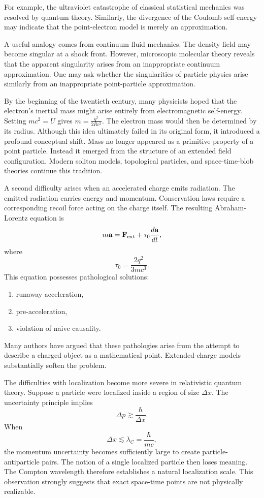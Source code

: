 For example, the ultraviolet catastrophe of classical statistical mechanics
was resolved by quantum theory. Similarly, the divergence of the Coulomb 
self-energy may indicate that the point-electron model is merely an 
approximation.

A useful analogy comes from continuum fluid mechanics. The density field
may become singular at a shock front.
However, microscopic molecular theory reveals that the apparent singularity
arises from an inappropriate continuum approximation.
One may ask whether the singularities of particle physics arise similarly 
from an inappropriate point-particle approximation.

By the beginning of the twentieth century, many physicists hoped that the 
electron's inertial mass might arise entirely from electromagnetic self-energy.
Setting $mc^2=U $ gives $m=\frac{q^2}{2 Rc^2}$.
The electron mass would then be determined by its radius.
Although this idea ultimately failed in its original form, it introduced 
a profound conceptual shift.
Mass no longer appeared as a primitive property of a point particle. 
Instead it emerged from the structure of an extended field configuration.
Modern soliton models, topological particles, and space-time-blob theories 
continue this tradition.

A second difficulty arises when an accelerated charge emits radiation.
The emitted radiation carries energy and momentum. Conservation laws 
require a corresponding recoil force acting on the charge itself.
The resulting Abraham-Lorentz equation is
\begin{equation}
    \label{al-eq}
m\mathbf{a}=\mathbf{F}_{\rm ext}
+\tau_0\frac{d\mathbf{a}}{dt},
\end{equation}
where \[\tau_0=\frac{2 q^2}{3 mc^3}.\]
This equation possesses pathological solutions:
\begin{enumerate}
\item runaway acceleration,
\item pre-acceleration,
\item violation of naive causality.
\end{enumerate}

Many authors have argued that these pathologies arise from the attempt 
to describe a charged object as a mathematical point.
Extended-charge models substantially soften the problem.

The difficulties with localization become more severe in relativistic quantum theory.
Suppose a particle were localized inside a region of size
$\Delta x$. The uncertainty principle implies 
    \[\Delta p \gtrsim \frac{\hbar}{\Delta x}.\]
When
\[\Delta x \lesssim \lambda_C = \frac{\hbar}{mc},\]
the momentum uncertainty becomes sufficiently large to create 
particle-antiparticle pairs.
The notion of a single localized particle then loses meaning.
The Compton wavelength therefore establishes a natural localization scale.
This observation strongly suggests that exact space-time points are not 
physically realizable.

